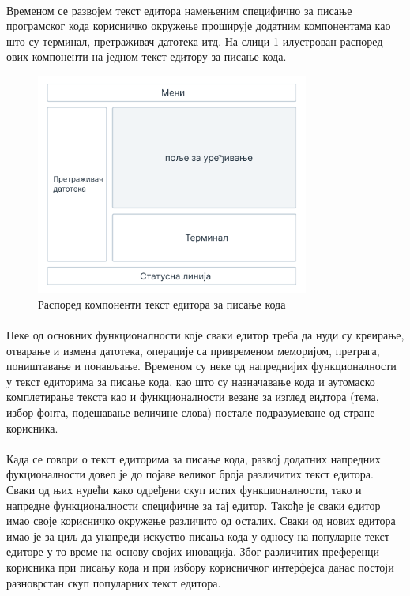\documentclass[12pt,oneside]{memoir}
\begin{document}
\paragraph{}
Временом се развојем текст едитора намењеним специфично за писање програмског кода
корисничко окружење проширује додатним компонентама као што су терминал, претраживач
датотека итд. На слици \ref{fig:layout} илустрован распоред ових
компоненти на једном текст едитору за писање кода.

\begin{figure}[!ht]
	\centering
	\includegraphics[width=0.8\textwidth]{images/raspored.png}
	\caption{Распоред компоненти текст едитора за писање кода}
	\label{fig:layout}
\end{figure}

\paragraph{}
Неке од основних функционалности које сваки едитор треба да нуди су креирање, отварање
и измена датотека, oперације са привременом меморијом, претрага, поништавање и 
понављање. Временом су неке од напреднијих функционалности у текст едиторима
за писање кода, као што су назначавање кода и аутомаско комплетирање текста као и
функционалности везане за изглед еидтора (тема, избор фонта, подешавање величине слова)
постале подразумеване од стране корисника.

\paragraph{}
Када се говори о текст едиторима за писање кода, развој додатних напредних фукционалности
довео је до појаве великог броја различитих текст едитора. Сваки од њих нудећи како
одређени скуп истих функционалности, тако и напредне функционалности специфичне за тај
едитор. Такође је сваки едитор имао своје корисничко окружење различито од осталих. Сваки од нових едитора имао је за циљ да унапреди искуство писања кода у односу на популарне
текст едиторе у то време на основу својих иновација. Због различитих преференци корисника
при писању кода и при избору корисничког интерфејса данас постоји разноврстан скуп
популарних текст едитора.
\end{document}
